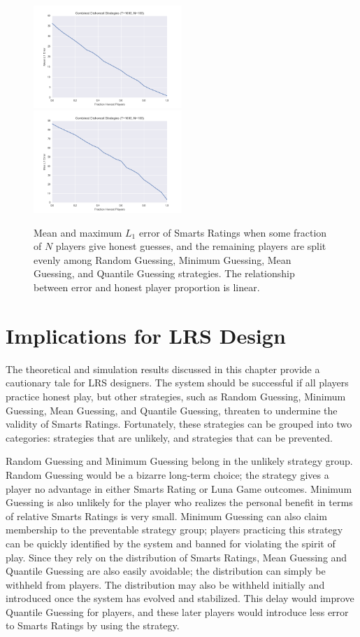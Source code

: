 \begin{figure}[H]
\centerline{%
\includegraphics[width=0.5\textwidth]{figures/robustness/Combined_Dishonest_Strategies31.png}
\includegraphics[width=0.5\textwidth] {figures/robustness/Combined_Dishonest_Strategies32.png}%
}%
\caption{Mean and maximum $L_1$ error of Smarts Ratings when some fraction of $N$ players give honest guesses, and the remaining players are split evenly among Random Guessing, Minimum Guessing, Mean Guessing, and Quantile Guessing strategies. The relationship between error and honest player proportion is linear.}
\label{fig:Combined}
\end{figure}
\section{Implications for LRS Design}

The theoretical and simulation results discussed in this chapter provide a cautionary tale for LRS designers. The system should be successful if all players practice honest play, but other strategies, such as Random Guessing, Minimum Guessing, Mean Guessing, and Quantile Guessing, threaten to undermine the validity of Smarts Ratings. Fortunately, these strategies can be grouped into two categories: strategies that are unlikely, and strategies that can be prevented. 

Random Guessing and Minimum Guessing belong in the unlikely strategy group. Random Guessing would be a bizarre long-term choice; the strategy gives a player no advantage in either Smarts Rating or Luna Game outcomes. Minimum Guessing is also unlikely for the player who realizes the personal benefit in terms of relative Smarts Ratings is very small. Minimum Guessing can also claim membership to the preventable strategy group; players practicing this strategy can be quickly identified by the system and banned for violating the spirit of play. Since they rely on the distribution of Smarts Ratings, Mean Guessing and Quantile Guessing are also easily avoidable; the distribution can simply be withheld from players. The distribution may also be withheld initially and introduced once the system has evolved and stabilized. This delay would improve Quantile Guessing for players, and these later players would introduce less error to Smarts Ratings by using the strategy.

